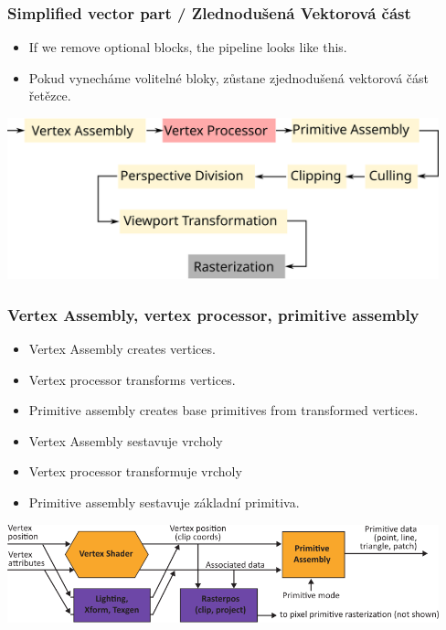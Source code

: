\begin{frame}
\frametitle{Simplified vector part / Zlednodušená Vektorová část}
  \scriptsize
	\begin{itemize}
		\item If we remove optional blocks, the pipeline looks like this.
	\end{itemize}
	\begin{itemize}
		\item Pokud vynecháme volitelné bloky, zůstane zjednodušená vektorová část řetězce.
	\end{itemize}
	\includegraphics[width=12.5cm,keepaspectratio]{pics/pipeline/simplified_pipeline}
\end{frame}

\begin{frame}
\frametitle{Vertex Assembly, vertex processor, primitive assembly}
  \scriptsize
	\begin{itemize}
		\item Vertex Assembly creates vertices.
    \item Vertex processor transforms vertices.
    \item Primitive assembly creates base primitives from transformed vertices.
  \end{itemize}
	\begin{itemize}
		\item Vertex Assembly sestavuje vrcholy
    \item Vertex processor transformuje vrcholy
    \item Primitive assembly sestavuje základní primitiva.
	\end{itemize}
	\includegraphics[width=12.5cm,keepaspectratio]{pics/pipeline/OpenGL460PipelineVertexShader}
\end{frame}

